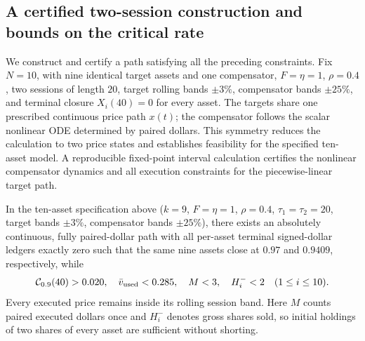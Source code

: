 \documentclass[review,hidelinks,onefignum,onetabnum]{siamonline250211}
\begin{document}
\subsection{A certified two-session construction and bounds on the critical rate}\label{subsec:v7-certified}
We construct and certify a path satisfying all the preceding constraints. Fix $N=10$, with nine identical target assets and one compensator, $F=\eta=1$, $\rho=0.4$, two sessions of length $20$, target rolling bands $\pm3\%$, compensator bands $\pm25\%$, and terminal closure $X_i(40)=0$ for every asset. The targets share one prescribed continuous price path $x(t)$; the compensator follows the scalar nonlinear ODE determined by paired dollars. This symmetry reduces the calculation to two price states and establishes feasibility for the specified ten-asset model. A reproducible fixed-point interval calculation certifies the nonlinear compensator dynamics and all execution constraints for the piecewise-linear target path.
\begin{proposition}\label{prop:certified-v7}
In the ten-asset specification above ($k=9$, $F=\eta=1$, $\rho=0.4$, $\tau_1=\tau_2=20$, target bands $\pm3\%$, compensator bands $\pm25\%$), there exists an absolutely continuous, fully paired-dollar path with all per-asset terminal signed-dollar ledgers exactly zero such that the same nine assets close at $0.97$ and $0.9409$, respectively, while
\begin{equation}\label{eq:v7-certified-result}
\mathcal{C}_{0.9}(40)>0.020,\quad \bar v_{\mathrm{used}}<0.285,\quad M<3,\quad H_i^-<2\quad(1\le i\le10).
\end{equation}
Every executed price remains inside its rolling session band. Here $M$ counts paired executed dollars once and $H_i^-$ denotes gross shares sold, so initial holdings of two shares of every asset are sufficient without shorting.
\end{proposition}
\end{document}
